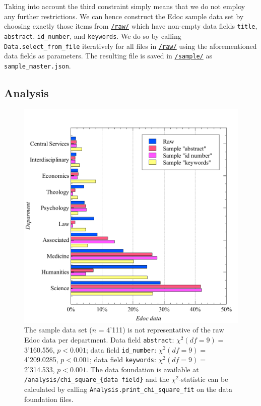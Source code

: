 Taking into account the third constraint simply means that we do not
employ any further restrictions. We can hence construct the Edoc sample
data set by choosing exactly those items from
\href{https://github.com/MHindermann/mas/tree/main/files/raw}{\texttt{/raw/}}
which have non-empty data fields \texttt{title}, \texttt{abstract},
\texttt{id\_number}, and \texttt{keywords}. We do so by calling
\texttt{Data.select\_from\_file} iteratively for all files in
\href{https://github.com/MHindermann/mas/tree/main/files/raw}{\texttt{/raw/}}
using the aforementioned data fields as parameters. The resulting file
is saved in
\href{https://github.com/MHindermann/mas/tree/main/files/sample}{\texttt{/sample/}}
as \texttt{sample\_master.json}.

\hypertarget{analysis}{%
\subsection{Analysis}\label{analysis}}

\begin{figure}
\centering
\includegraphics{images/chi_square_selection_fields.pdf}
\caption{The sample data set (\(n\) = 4'111) is not representative of
the raw Edoc data per department. Data field \texttt{abstract}:
\(\chi^2 (df=9) =\) 3'160.556, \(p < 0.001\); data field
\texttt{id\_number}: \(\chi^2 (df=9) =\) 4'209.0285, \(p < 0.001\); data
field \texttt{keywords}: \(\chi^2 (df=9) =\) 2'314.533, \(p < 0.001\).
The data foundation is available at
\texttt{/analysis/chi\_square\_\{data\ field\}} and the
\(\chi^2\)-statistic can be calculated by calling
\texttt{Analysis.print\_chi\_square\_fit} on the data foundation files.}
\end{figure}

